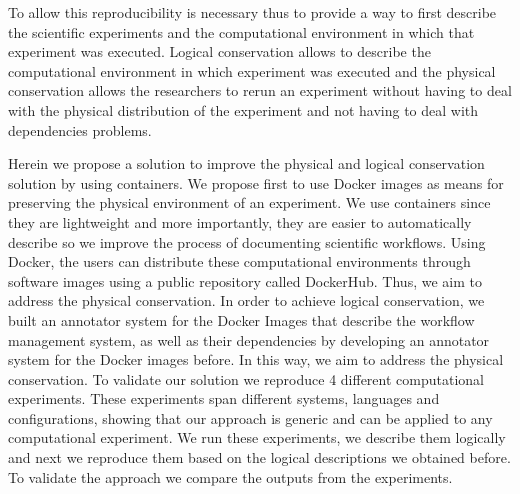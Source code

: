 To allow this reproducibility is necessary thus to provide a way to first describe the scientific experiments and the computational environment in which that experiment was executed. Logical conservation allows to describe the computational environment in which experiment was executed and the physical conservation allows the researchers to rerun an experiment without having to deal with the physical distribution of the experiment and not having to deal with dependencies problems. 

Herein we propose a solution to improve the physical and logical conservation solution by using containers. 
We propose first to use Docker images as means for preserving the physical environment of an experiment. We use containers since they are lightweight and more importantly, they are easier to automatically describe so we improve the process of documenting scientific workflows.
Using Docker, the users can distribute these computational environments through software images using a public repository called DockerHub. Thus, we aim to address the physical conservation.
In order to achieve logical conservation, we built an annotator system for the Docker Images that describe the workflow management system, as well as their dependencies by developing an annotator system for the Docker images before. In this way, we aim to address the physical conservation.
To validate our solution we reproduce 4 different computational experiments. These experiments span different systems, languages and configurations, showing that our approach is generic and can be applied to any computational experiment. We run these experiments, we describe them logically and next we reproduce them based on the logical descriptions we obtained before. To validate the approach we compare the outputs from the experiments.






